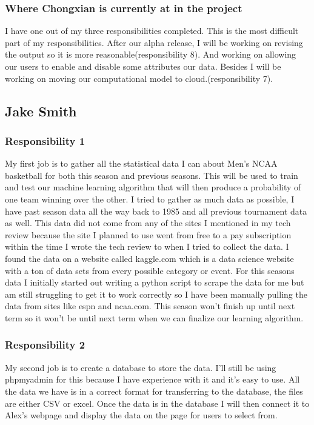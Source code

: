 \documentclass[letterpaper, 10pt,titlepage]{article}
\begin{document}
\subsubsection{Where Chongxian is currently at in the project}
\par I have one out of my three responsibilities completed. This is the most difficult part of my responsibilities. After our alpha release, I will be working on revising the output so it is more reasonable(responsibility 8). And working on allowing our users to enable and disable some attributes our data. Besides I will be working on moving our computational model to cloud.(responsibility 7). 

\subsection{Jake Smith}
\subsubsection{Responsibility 1}
My first job is to gather all the statistical data I can about Men’s NCAA basketball for both this season and previous seasons. This will be used to train and test our machine learning algorithm that will then produce a probability of one team winning over the other. I tried to gather as much data as possible, I have past season data all the way back to 1985 and all previous tournament data as well. This data did not come from any of the sites I mentioned in my tech review because the site I planned to use went from free to a pay subscription within the time I wrote the tech review to when I tried to collect the data. I found the data on a website called kaggle.com which is a data science website with a ton of data sets from every possible category or event. For this seasons data I initially started out writing a python script to scrape the data for me but am still struggling to get it to work correctly so I have been manually pulling the data from sites like espn and ncaa.com. This season won’t finish up until next term so it won’t be until next term when we can finalize our learning algorithm.
\subsubsection{Responsibility 2}
My second job is to create a database to store the data. I’ll still be using phpmyadmin for this because I have experience with it and it’s easy to use. All the data we have is in a correct format for transferring to the database, the files are either CSV or excel. Once the data is in the database I will then connect it to Alex’s webpage and display the data on the page for users to select from.
\end{document}
